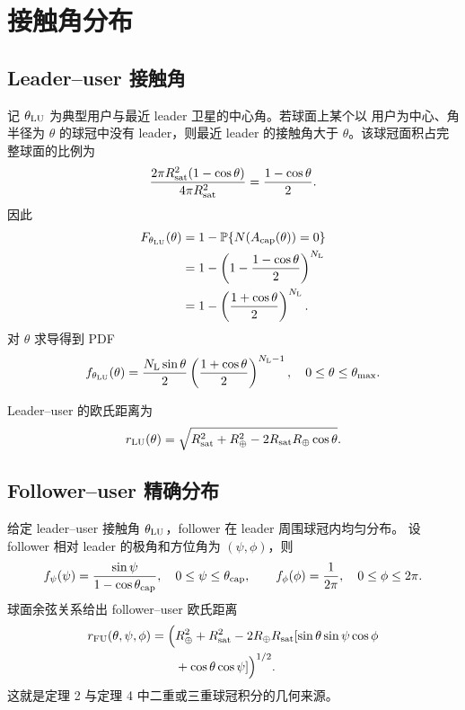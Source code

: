 \documentclass[UTF8,a4paper,11pt]{ctexart}
\newcommand{\Rearth}{R_{\oplus}}
\newcommand{\Rsat}{R_{\rm sat}}
\newcommand{\thetac}{\theta_{\rm cap}}
\newcommand{\thetam}{\theta_{\max}}
\newcommand{\NL}{N_{\rm L}}
\newcommand{\Prob}{\mathbb{P}}
\newcommand{\rLU}{r_{\rm LU}}
\newcommand{\rFU}{r_{\rm FU}}
\begin{document}
\section{接触角分布}

\subsection{Leader--user 接触角}

记 $\theta_{\rm LU}$ 为典型用户与最近 leader 卫星的中心角。若球面上某个以
用户为中心、角半径为 $\theta$ 的球冠中没有 leader，则最近 leader 的接触角大于
$\theta$。该球冠面积占完整球面的比例为
\begin{equation}
    \frac{2\pi\Rsat^2(1-\cos\theta)}{4\pi\Rsat^2}
    =\frac{1-\cos\theta}{2}.
\end{equation}
因此
\begin{align}
    F_{\theta_{\rm LU}}(\theta)
    &=1-\Prob\{N(A_{\rm cap}(\theta))=0\} \notag\\
    &=1-\left(1-\frac{1-\cos\theta}{2}\right)^{\NL} \notag\\
    &=1-\left(\frac{1+\cos\theta}{2}\right)^{\NL}.
\end{align}
对 $\theta$ 求导得到 PDF
\begin{equation}
    f_{\theta_{\rm LU}}(\theta)
    =\frac{\NL\sin\theta}{2}
    \left(\frac{1+\cos\theta}{2}\right)^{\NL-1},
    \quad 0\leq\theta\leq\thetam.
    \label{eq:f-theta-lu}
\end{equation}

Leader--user 的欧氏距离为
\begin{equation}
    \rLU(\theta)=
    \sqrt{\Rsat^2+\Rearth^2-2\Rsat\Rearth\cos\theta}.
    \label{eq:r-lu}
\end{equation}

\subsection{Follower--user 精确分布}

给定 leader--user 接触角 $\theta_{\rm LU}$，follower 在 leader 周围球冠内均匀分布。
设 follower 相对 leader 的极角和方位角为 $(\psi,\phi)$，则
\begin{equation}
    f_\psi(\psi)=\frac{\sin\psi}{1-\cos\thetac},\quad
    0\leq\psi\leq\thetac,\qquad
    f_\phi(\phi)=\frac{1}{2\pi},\quad0\leq\phi\leq2\pi .
\end{equation}
球面余弦关系给出 follower--user 欧氏距离
\begin{equation}
\begin{aligned}
    \rFU(\theta,\psi,\phi)
    =\Big(&\Rearth^2+\Rsat^2
    -2\Rearth\Rsat[
    \sin\theta\sin\psi\cos\phi\\
    &+\cos\theta\cos\psi]\Big)^{1/2}.
\end{aligned}
\label{eq:r-fu}
\end{equation}
这就是定理 2 与定理 4 中二重或三重球冠积分的几何来源。
\end{document}
